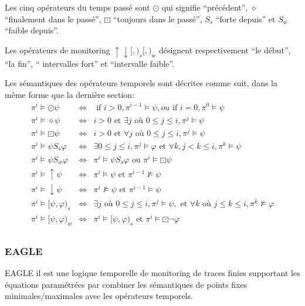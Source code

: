 Les cinq opérateurs du temps passé sont $\odot$ qui signifie ``précédent'', $\diamond$ ``finalement dans le passé'', $\boxdot$ ``toujours dans le passé'', $\mathrel{S_s}$ ``forte depuis'' et $\mathrel{S_w}$ ``faible depuis''.

Les opérateurs de monitoring $\uparrow \downarrow [,)_s [,)_w$ désignent respectivement ``le début'', ``la fin'', `` intervalles fort'' et ``intervalle faible''.

Les sémantiques des opérateurs temporels sont décrites comme suit, dans la même forme que la dernière section:
\begin{eqnarray*}
\pi^i \vDash \odot \psi & \iff & \mbox{ if } i > 0, \pi^{i - 1} \vDash \psi, ou \mbox{ if } i = 0, \pi^0 \vDash \psi \\
\pi^i \vDash \diamond \psi & \iff & i > 0 \mbox{ et } \exists j \mbox{ où } 0 \leq j \leq i, \pi^j \vDash \psi \\
\pi^i \vDash \boxdot \psi & \iff & i > 0 \mbox{ et } \forall j \mbox{ où } 0 \leq j \leq i, \pi^j \vDash \psi \\
\pi^i \vDash \psi \mathrel{S_s} \varphi & \iff & \exists 0 \leq j \leq i, \pi^j \vDash \varphi \mbox{ et } \forall k, j < k \leq i, \pi^k \vDash \psi \\
\pi^i \vDash \psi \mathrel{S_w} \varphi & \iff & \pi^i \vDash \psi \mathrel{S_s} \varphi \mbox{ ou } \pi^i \vDash \boxdot\psi \\
\pi^i \vDash \uparrow \psi & \iff & \pi^i \vDash \psi \mbox{ et } \pi^{i - 1} \nvDash \psi \\
\pi^i \vDash \downarrow \psi & \iff & \pi^i \nvDash \psi \mbox{ et } \pi^{i - 1} \vDash \psi \\
\pi^i \vDash [\psi, \varphi)_s & \iff & \exists j \mbox{ où } 0 \leq j \leq i, \pi^j \vDash \psi, \mbox{ et } \forall k \mbox{ où } j \leq k \leq i, \pi^k \nvDash \varphi \\
\pi^i \vDash [\psi, \varphi)_w & \iff & \pi^i \vDash [\psi, \varphi)_s \mbox{ et } \pi^i \vDash \boxdot\neg\varphi \\
\end{eqnarray*}

\subsubsection{EAGLE}

EAGLE \citep{barringer2004rule} il est une logique temporelle de monitoring de traces finies supportant les équations paramétrées par combiner les sémantiques de points fixes minimales/maximales avec les opérateurs temporels.

